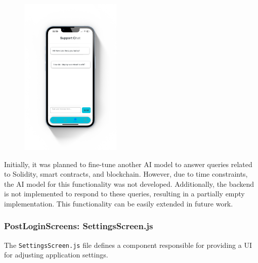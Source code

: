 \begin{figure}[!ht]
    \centering
    \includegraphics[width=0.43\textwidth]
    {LATEX/Appendices/Images/Software/Frontend/support_screen.png}
    \label{fig:support screen}
\end{figure}

Initially, it was planned to fine-tune another AI model to answer queries related to Solidity, smart contracts, and blockchain. However, due to time constraints, the AI model for this functionality was not developed. Additionally, the backend is not implemented to respond to these queries, resulting in a partially empty implementation. This functionality can be easily extended in future work.

\subsubsection{PostLoginScreens: SettingsScreen.js}

The \texttt{SettingsScreen.js} file defines a component responsible for providing a UI for adjusting application settings.

